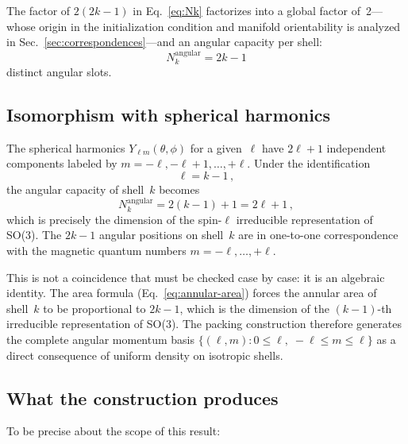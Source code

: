 \documentclass[aps,prl,reprint,amsmath,amssymb]{revtex4-2}
\begin{document}
The factor of $2(2k-1)$ in Eq.~\eqref{eq:Nk} factorizes into a
global factor of~2---whose origin in the initialization condition and
manifold orientability is analyzed in
Sec.~\ref{sec:correspondences}---and an angular capacity per shell:
\begin{equation}
  N_k^{\mathrm{angular}} = 2k - 1
  \label{eq:angular-capacity}
\end{equation}
distinct angular slots.

\subsection{Isomorphism with spherical harmonics}

The spherical harmonics $Y_{\ell m}(\theta, \phi)$ for a given~$\ell$
have $2\ell + 1$ independent components labeled by
$m = -\ell, -\ell+1, \ldots, +\ell$.  Under the identification
\begin{equation}
  \ell = k - 1 \,,
  \label{eq:ell-k}
\end{equation}
the angular capacity of shell~$k$ becomes
\begin{equation}
  N_k^{\mathrm{angular}} = 2(k-1) + 1 = 2\ell + 1 \,,
  \label{eq:2ell-plus-1}
\end{equation}
which is precisely the dimension of the spin-$\ell$ irreducible
representation of SO(3).  The $2k-1$ angular positions on shell~$k$
are in one-to-one correspondence with the magnetic quantum numbers
$m = -\ell, \ldots, +\ell$.

This is not a coincidence that must be checked case by case: it is an
algebraic identity.  The area formula
(Eq.~\ref{eq:annular-area}) forces the annular area of shell~$k$ to
be proportional to $2k-1$, which is the dimension of the
$(k{-}1)$-th irreducible representation of SO(3).  The packing
construction therefore generates the complete angular momentum basis
$\{(\ell, m) : 0 \leq \ell, \; -\ell \leq m \leq \ell\}$ as a direct
consequence of uniform density on isotropic shells.

\subsection{What the construction produces}

To be precise about the scope of this result:
\end{document}

